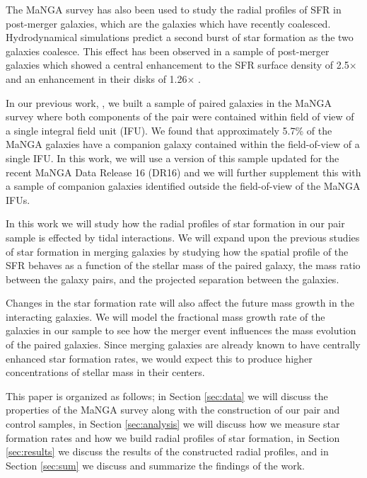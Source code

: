 \documentclass[iop,revtex4,twocolumn,apj,numberedappendix,appendixfloats]{emulateapj}
\begin{document}
The MaNGA survey has also been used to study the radial profiles of SFR in post-merger galaxies, which are the galaxies which have recently coalesced. Hydrodynamical simulations predict a second burst of star formation as the two galaxies coalesce. This effect has been observed in a sample of post-merger galaxies which showed a central enhancement to the SFR surface density of 2.5$\times$ and an enhancement in their disks of 1.26$\times$ \citep{Thorp:2019}.

In our previous work, \citet{Fu:2018}, we built a sample of paired galaxies in the MaNGA survey where both components of the pair were contained within field of view of a single integral field unit (IFU). We found that approximately 5.7\% of the MaNGA galaxies have a companion galaxy contained within the field-of-view of a single IFU. In this work, we will use a version of this sample updated for the recent MaNGA Data Release 16 (DR16) and we will further supplement this with a sample of companion galaxies identified outside the field-of-view of the MaNGA IFUs. 

In this work we will study how the radial profiles of star formation in our pair sample is effected by tidal interactions. We will expand upon the previous studies of star formation in merging galaxies by studying how the spatial profile of the SFR behaves as a function of the stellar mass of the paired galaxy, the mass ratio between the galaxy pairs, and the projected separation between the galaxies. 


Changes in the star formation rate will also affect the future mass growth in the interacting galaxies. We will model the fractional mass growth rate of the galaxies in our sample to see how the merger event influences the mass evolution of the paired galaxies. Since merging galaxies are already known to have centrally enhanced star formation rates, we would expect this to produce higher concentrations of stellar mass in their centers.

This paper is organized as follows; in Section \ref{sec:data} we will discuss the properties of the MaNGA survey along with the construction of our pair and control samples, in Section \ref{sec:analysis} we will discuss how we measure star formation rates and how we build radial profiles of star formation, in Section \ref{sec:results} we discuss the results of the constructed radial profiles, and in Section \ref{sec:sum} we discuss and summarize the findings of the work. 

\end{document}
